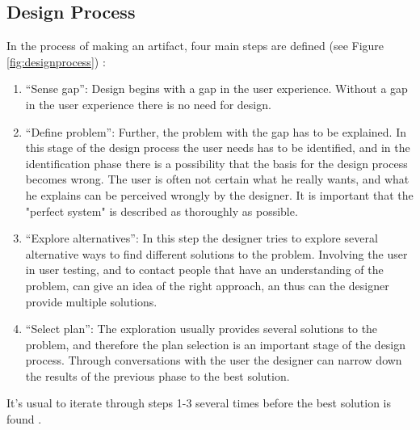 \subsection{Design Process}
\label{sec:designprocess}
In the process of making an artifact, four main steps are defined (see Figure \ref{fig:designprocess}) :
\begin{enumerate}
 \item ``Sense gap'': Design begins with a gap in the user experience. Without a gap in the user experience there is no need for design.
 \item ``Define problem'': Further, the problem with the gap has to be explained. In this stage of the design process the user needs has to be identified, and in the identification phase there is a possibility that the basis for the design process becomes wrong. The user is often not certain what he really wants, and what he explains can be perceived wrongly by the designer. It is important that the "perfect system" is described as thoroughly as possible.
 \item ``Explore alternatives'': In this step the designer tries to explore several alternative ways to find  different solutions to the problem. Involving the user in user testing, and to contact people that have an understanding of the problem, can give an idea of the right approach, an thus can the designer provide multiple solutions.
     \item ``Select plan'': The exploration usually provides several solutions to the problem, and therefore the plan selection is an important stage of the design process. Through conversations with the user the designer can narrow down the results of the previous phase to the best solution.
 \end{enumerate}
 It's usual to iterate through steps 1-3 several times before the best solution is found \cite{ulrich}.
 
